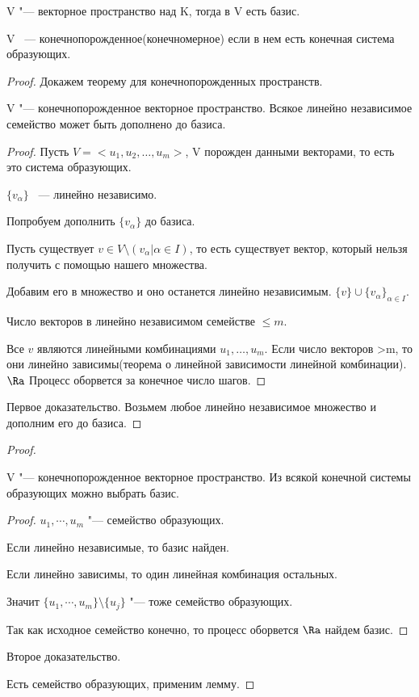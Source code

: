 \begin{theorem}{}
V "--- векторное пространство над K, тогда в V есть базис.
\end{theorem}

\begin{Def}
    V ~--- конечнопорожденное(конечномерное) если в нем есть
    конечная система образующих.
\end{Def}
\begin{proof}
    Докажем теорему для конечнопорожденных пространств.
    
    \begin{lemma}
        V "--- конечнопорожденное векторное пространство.
        Всякое линейно независимое семейство может быть дополнено до базиса. 
    \end{lemma}
    \begin{proof}
        Пусть $V = < u_1, u_2, \ldots, u_m >$, V порожден данными векторами, то есть это система образующих.

        $\{v_{\alpha}\}$ ~--- линейно независимо. 

        Попробуем дополнить $\{v_{\alpha}\}$  до базиса. 

        Пусть существует $v \in V \setminus (v_{\alpha}|\alpha \in I)$, то есть существует вектор, который нельзя получить с помощью нашего множества. 

        Добавим его в множество и оно останется линейно независимым. $\{v\} \cup \{v_{\alpha}\}_{\alpha \in I}$.

        Число векторов в линейно независимом семействе $\le m$.

        Все $v$ являются линейными комбинациями $u_1, \ldots, u_m$.
        Если число векторов >m, то они линейно зависимы(теорема о линейной зависимости линейной комбинации). 
        $\Ra$ Процесс оборвется за конечное число шагов. 
    \end{proof}
    
    Первое доказательство. Возьмем любое линейно независимое множество и дополним его до базиса. 
\end{proof}

\begin{proof}
    \begin{lemma}
    V "--- конечнопорожденное векторное пространство. 
    Из всякой конечной системы образующих можно выбрать базис. 
    \end{lemma}

    \begin{proof}
        $u_1, \cdots, u_m$ "--- семейство образующих. 

        Если линейно независимые, то базис найден.

        Если линейно зависимы, то один линейная комбинация остальных. 

        Значит $\{u_1, \cdots, u_m\} \setminus \{u_j\}$ "--- тоже семейство образующих.

        Так как исходное семейство конечно, то процесс оборвется $\Ra$ найдем базис. 
    \end{proof}

    Второе доказательство. 

    Есть семейство образующих, применим лемму. 
\end{proof}

